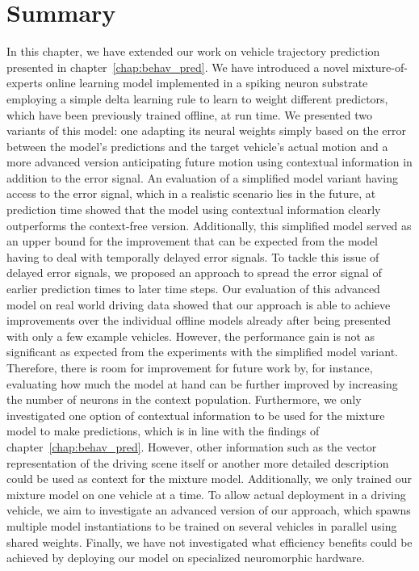 \section{Summary}
\label{sec:online_learn_summ}

In this chapter, we have extended our work on vehicle trajectory prediction presented in chapter~\ref{chap:behav_pred}.
We have introduced a novel mixture-of-experts online learning model implemented in a spiking neuron substrate employing a simple delta learning rule to learn to weight different predictors, which have been previously trained offline, at run time.
We presented two variants of this model: one adapting its neural weights simply based on the error between the model's predictions and the target vehicle's actual motion and a more advanced version anticipating future motion using contextual information in addition to the error signal.
An evaluation of a simplified model variant having access to the error signal, which in a realistic scenario lies in the future, at prediction time showed that the model using contextual information clearly outperforms the context-free version.
Additionally, this simplified model served as an upper bound for the improvement that can be expected from the model having to deal with temporally delayed error signals.
To tackle this issue of delayed error signals, we proposed an approach to spread the error signal of earlier prediction times to later time steps.
Our evaluation of this advanced model on real world driving data showed that our approach is able to achieve improvements over the individual offline models already after being presented with only a few example vehicles.
However, the performance gain is not as significant as expected from the experiments with the simplified model variant.
Therefore, there is room for improvement for future work by, for instance, evaluating how much the model at hand can be further improved by increasing the number of neurons in the context population.
Furthermore, we only investigated one option of contextual information to be used for the mixture model to make predictions, which is in line with the findings of chapter~\ref{chap:behav_pred}.
However, other information such as the vector representation of the driving scene itself or another more detailed description could be used as context for the mixture model.
Additionally, we only trained our mixture model on one vehicle at a time.
To allow actual deployment in a driving vehicle, we aim to investigate an advanced version of our approach, which spawns multiple model instantiations to be trained on several vehicles in parallel using shared weights.
Finally, we have not investigated what efficiency benefits could be achieved by deploying our model on specialized neuromorphic hardware.
